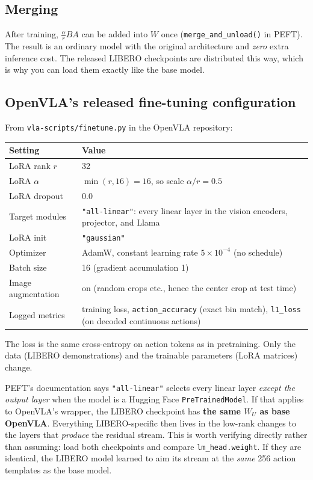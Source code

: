\documentclass[11pt]{article}
\begin{document}
\subsection{Merging}
After training, $\frac{\alpha}{r}BA$ can be added into $W$ once (\texttt{merge\_and\_unload()} in PEFT). The result is an ordinary model with the original architecture and \emph{zero} extra inference cost. The released LIBERO checkpoints are distributed this way, which is why you can load them exactly like the base model.

\subsection{OpenVLA's released fine-tuning configuration}
From \texttt{vla-scripts/finetune.py} in the OpenVLA repository:
\begin{center}
\begin{tabularx}{\linewidth}{@{}lX@{}}
\toprule
Setting & Value \\
\midrule
LoRA rank $r$ & 32 \\
LoRA $\alpha$ & $\min(r, 16) = 16$, so scale $\alpha/r = 0.5$ \\
LoRA dropout & 0.0 \\
Target modules & \texttt{"all-linear"}: every linear layer in the vision encoders, projector, and Llama \\
LoRA init & \texttt{"gaussian"} \\
Optimizer & AdamW, constant learning rate $5\times10^{-4}$ (no schedule) \\
Batch size & 16 (gradient accumulation 1) \\
Image augmentation & on (random crops etc., hence the center crop at test time) \\
Logged metrics & training loss, \texttt{action\_accuracy} (exact bin match), \texttt{l1\_loss} (on decoded continuous actions) \\
\bottomrule
\end{tabularx}
\end{center}
The loss is the same cross-entropy on action tokens as in pretraining. Only the data (LIBERO demonstrations) and the trainable parameters (LoRA matrices) change.

\begin{interp}
PEFT's documentation says \texttt{"all-linear"} selects every linear layer \emph{except the output layer} when the model is a Hugging Face \texttt{PreTrainedModel}. If that applies to OpenVLA's wrapper, the LIBERO checkpoint has \textbf{the same $W_U$ as base OpenVLA}. Everything LIBERO-specific then lives in the low-rank changes to the layers that \emph{produce} the residual stream. This is worth verifying directly rather than assuming: load both checkpoints and compare \texttt{lm\_head.weight}. If they are identical, the LIBERO model learned to aim its stream at the \emph{same} 256 action templates as the base model.
\end{interp}
\end{document}
